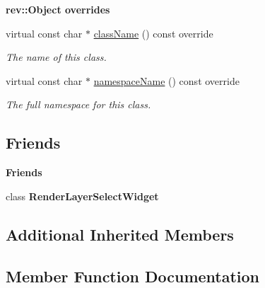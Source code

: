 \begin{Indent}\textbf{ rev\+::Object overrides}\par
\begin{DoxyCompactItemize}
\item 
virtual const char $\ast$ \mbox{\hyperlink{classrev_1_1_view_1_1_render_layer_select_item_a8f14c80f13b45c055eeab73af921535b}{class\+Name}} () const override
\begin{DoxyCompactList}\small\item\em The name of this class. \end{DoxyCompactList}\item 
virtual const char $\ast$ \mbox{\hyperlink{classrev_1_1_view_1_1_render_layer_select_item_a2d8ca1314c2b66567c2e9de8bd717f4f}{namespace\+Name}} () const override
\begin{DoxyCompactList}\small\item\em The full namespace for this class. \end{DoxyCompactList}\end{DoxyCompactItemize}
\end{Indent}
\subsection*{Friends}
\begin{Indent}\textbf{ Friends}\par
\begin{DoxyCompactItemize}
\item 
\mbox{\label{classrev_1_1_view_1_1_render_layer_select_item_ada85eef2ccf0f12fefe62f37eb125cd0}} 
class {\bfseries Render\+Layer\+Select\+Widget}
\end{DoxyCompactItemize}
\end{Indent}
\subsection*{Additional Inherited Members}


\subsection{Member Function Documentation}
\mbox{\label{classrev_1_1_view_1_1_render_layer_select_item_a8f14c80f13b45c055eeab73af921535b}} 
